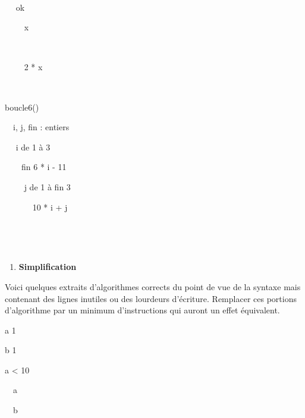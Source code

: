 {\sffamily
\ \ }

{\sffamily
\ \  ok }

{\sffamily
\ \ \ \  x}

{\sffamily
\ \ }

{\sffamily
\ \ \ \  2 * x}

{\sffamily
\ \ }

{\sffamily
{} }


\bigskip

{\sffamily
{} boucle6()}

{\sffamily
\ \ i, j, fin : entiers}

{\sffamily
\ \  i de 1 à 3 }

{\sffamily
\ \ \ \ fin  6 * i - 11}

{\sffamily
\ \ \ \  j de 1 à fin  3
 }

{\sffamily
\ \ \ \ \ \  10 * i +
j}

{\sffamily
{\ \ \ \ } \ \ \ \ \ }

{\sffamily
\ \ }

{\sffamily
{}}


\bigskip

\liststyleExercice
\setcounter{saveenum}{\value{enumi}}
\begin{enumerate}
\setcounter{enumi}{\value{saveenum}}
\item {\sffamily\bfseries
Simplification}
\end{enumerate}
{
Voici quelques extraits d’algorithmes corrects du point de vue de la
syntaxe mais contenant des lignes inutiles ou des lourdeurs d’écriture.
Remplacer ces portions d’algorithme par un minimum d’instructions qui
auront un effet équivalent.}

{\sffamily
a  1}

{\sffamily
b  1}

{\sffamily
{} a {\textless} 10 }

{\sffamily
\ \ {a
}}

{\sffamily
{\ \ b
}}

